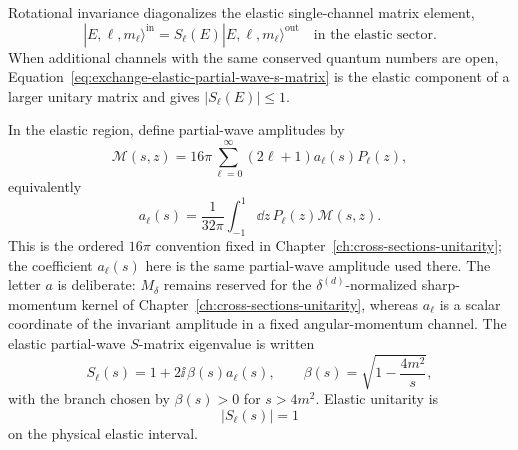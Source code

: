 Rotational invariance diagonalizes the elastic single-channel matrix element,
\begin{equation}
  |E,\ell,m_\ell\rangle^{\mathrm{in}}
  =
  S_\ell(E)|E,\ell,m_\ell\rangle^{\mathrm{out}}
  \quad
  \text{in the elastic sector}.
  \label{eq:exchange-elastic-partial-wave-s-matrix}
\end{equation}
When additional channels with the same conserved quantum numbers are open,
Equation~\eqref{eq:exchange-elastic-partial-wave-s-matrix} is the elastic
component of a larger unitary matrix and gives \(|S_\ell(E)|\le1\).

In the elastic region, define partial-wave amplitudes by
\begin{equation}
  \mathcal M(s,z)
  =
  16\pi\sum_{\ell=0}^{\infty}
  (2\ell+1)a_\ell(s)P_\ell(z),
  \label{eq:exchange-partial-wave-expansion}
\end{equation}
equivalently
\begin{equation}
  a_\ell(s)
  =
  \frac{1}{32\pi}\int_{-1}^{1}\dd z\,
  P_\ell(z)\mathcal M(s,z).
  \label{eq:exchange-partial-wave-projection}
\end{equation}
This is the ordered \(16\pi\) convention fixed in
Chapter~\ref{ch:cross-sections-unitarity}; the coefficient \(a_\ell(s)\) here
is the same partial-wave amplitude used there.  The letter \(a\) is deliberate:
\(M_\delta\) remains reserved for the \(\delta^{(d)}\)-normalized
sharp-momentum kernel of
Chapter~\ref{ch:cross-sections-unitarity}, whereas \(a_\ell\) is a scalar
coordinate of the invariant amplitude in a fixed angular-momentum channel.
The elastic partial-wave \(S\)-matrix eigenvalue is written
\[
  S_\ell(s)=1+2\ii\,\beta(s)a_\ell(s),
  \qquad
  \beta(s)=\sqrt{1-\frac{4m^2}{s}},
\]
with the branch chosen by \(\beta(s)>0\) for \(s>4m^2\). Elastic unitarity is
\[
  |S_\ell(s)|=1
\]
on the physical elastic interval.

